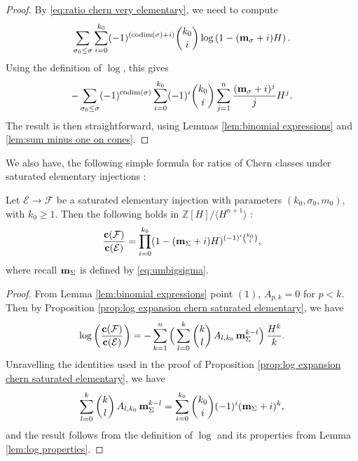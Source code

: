 \documentclass[a4paper,10pt]{amsart}
\theoremstyle{plain}{
    \newtheorem{theorem}{Theorem}[section]
    \newtheorem{lemma}[theorem]{Lemma}
    \newtheorem{corollary}[theorem]{Corollary}
    \newtheorem{proposition}[theorem]{Proposition}
    \newtheorem{conjecture}[theorem]{Conjecture}
}
\theoremstyle{definition}{
    \newtheorem{definition}[theorem]{Definition}
    \newtheorem{defn-thm}[theorem]{Definition-Theorem}
    \newtheorem{example}[theorem]{Example}
    \newtheorem{notation}[theorem]{Notation}
}
\theoremstyle{remark}{
    \newtheorem{remark}[theorem]{Remark}
    \newtheorem{problem}[theorem]{Problem}
    \newtheorem{question}[theorem]{Question}
}
\def\um{{\bf m}}
\def\uc{{\bf c}}
\def\cF{\mathcal{F}}
\def\cE{\mathcal{E}}
\def\Z{\mathbb{Z}}
\def\codim{\mathrm{codim}}
\begin{document}
 \begin{proof}
  By \eqref{eq:ratio chern very elementary}, we need to compute
  $$
  \sum_{\sigma_0\leq\sigma}\sum_{i=0}^{k_0}(-1)^{(\codim(\sigma)+i)}\binom{k_0}{i}\log\left(1-(\um_\sigma+i)H\right).
  $$
  Using the definition of $\log$, this gives
  $$
  -\sum_{\sigma_0\leq\sigma}(-1)^{\codim(\sigma)}\sum_{i=0}^{k_0}(-1)^{i}\binom{k_0}{i}\sum_{j=1}^n  \frac{(\um_\sigma+i)^j}{j}H^j.
  $$
  The result is then straightforward, using Lemmas \ref{lem:binomial expressions} and \ref{lem:sum minus one on cones}.
 \end{proof}
 We also have, the following simple formula for ratios of Chern classes under saturated elementary injections :
 \begin{corollary}
  \label{cor:simplest product formula Chern ratios saturated elementary}
  Let $\cE\to \cF$ be a saturated elementary injection with parameters $(k_0,\sigma_0,m_0)$, with $k_0\geq 1$. Then the following holds in $\Z[H]/\langle H^{n+1} \rangle$ :
  \begin{equation}
   \label{eq:simplest product formula Chern ratios}
  \frac{\uc(\cF)}{\uc(\cE)}=\prod_{i=0}^{k_0}(1-(\um_\Sigma+i)H)^{(-1)^i\binom{k_0}{i}},
  \end{equation}
  where recall $\um_\Sigma$ is defined by \eqref{eq:umbigsigma}.
 \end{corollary}
\begin{proof}
From Lemma \ref{lem:binomial expressions} point $(1)$, $A_{p,k}=0$ for $p < k$. Then by Proposition \ref{prop:log expansion chern saturated elementary}, we have 
$$
\log\left(\frac{\uc(\cF)}{\uc(\cE)}\right)=-\sum_{k=1}^n \Big(\sum_{l=0}^k \binom{k}{l}\, A_{l,k_0}\, \um_\Sigma^{k-l} \Big)\, \frac{H^k}{k}.
$$
Unravelling the identities used in the proof of Proposition \ref{prop:log expansion chern saturated elementary}, we have
$$
\sum_{l=0}^k \binom{k}{l}\, A_{l,k_0}\, \um_\Sigma^{k-l} = \sum_{i=0}^{k_0}\binom{k_0}{i} (-1)^i(\um_\Sigma+i)^k,
$$
and the result follows from the definition of $\log$ and its properties from Lemma \ref{lem:log properties}.
\end{proof}
\end{document}
